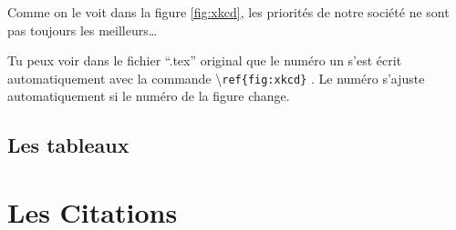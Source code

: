 \documentclass[a4paper, 10pt]{article}
\newcommand{\command}[1]{
	\colorbox{codebackground}{\scriptsize{\textbackslash}\texttt{#1}}
}
\begin{document}
\begin{center}
Comme on le voit dans la figure \ref{fig:xkcd}, les priorités de notre
société ne sont pas toujours les meilleurs\ldots
\end{center}

Tu peux voir dans le fichier ``.tex'' original que le numéro un s'est
écrit automatiquement avec la commande \command{ref\{fig:xkcd\}}. Le numéro
s'ajuste automatiquement si le numéro de la figure change.

\subsection{Les tableaux}

\section{Les Citations}
\end{document}
